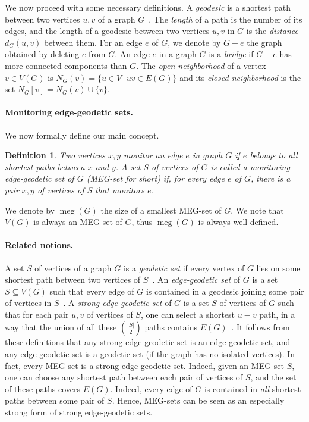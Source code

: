 \documentclass[10pt,a4paper]{article}
\newtheorem{definition}[theorem]{Definition}
\DeclareMathOperator{\MEG}{meg}
\begin{document}
We now proceed with some necessary definitions. A \emph{geodesic} is a shortest path between two vertices $u,v$ of a graph $G$~\cite{b2}. The \emph{length} of a path is the number of its edges, and the length of a geodesic between two vertices $u,v$ in $G$ is the \emph{distance} $d_G(u,v)$ between them. For an edge $e$ of $G$, we denote by $G-e$ the graph obtained by deleting $e$ from $G$. An edge $e$ in a graph $G$ is a \emph{bridge} if $G-e$ has more connected components than $G$. 
The \emph{open neighborhood} of a vertex $v \in V(G)$ is $N_G(v) = \{u \in V \, | \, uv \in E(G)\}$ and its \emph{closed neighborhood} is the set $N_G[v] = N_G(v) \cup \{v\}$.  
 


\paragraph{Monitoring edge-geodetic sets.}
We now formally define our main concept. 

\begin{definition}
Two vertices $x,y$ \emph{monitor} an edge $e$ in graph $G$ if $e$ belongs to all shortest paths between $x$ and $y$. A set $S$ of vertices of $G$ is called a \emph{monitoring edge-geodetic set} of $G$ (\emph{MEG-set} for short) if, for every edge $e$ of $G$, there is a pair $x,y$ of vertices of $S$ that monitors $e$.
\end{definition}

We denote by $\MEG(G)$ the size of a smallest MEG-set of $G$. We note that $V(G)$ is always an MEG-set of $G$, thus $\MEG(G)$ is always well-defined.


\paragraph{Related notions.}
A set $S$ of vertices of a graph $G$ is a \emph{geodetic set} if every vertex of $G$ lies on some shortest path between two vertices of $S$~\cite{r4}. An \emph{edge-geodetic set} of $G$ is a set $S \subseteq V(G)$ such that every edge of $G$ is contained in a geodesic joining some pair of vertices in $S$~\cite{r5}. A \emph{strong edge-geodetic set} of $G$ is a set $S$ of vertices of $G$ such that for each pair $u,v$ of vertices of $S$, one can select a shortest $u-v$ path, in a way that the union of all these $\binom{|S|}{2}$ paths contains $E(G)$~\cite{SEGS}. It follows from these definitions that any strong edge-geodetic set is an edge-geodetic set, and any edge-geodetic set is a geodetic set (if the graph has no isolated vertices). In fact, every MEG-set is a strong edge-geodetic set. Indeed, given an MEG-set $S$, one can choose any shortest path between each pair of vertices of $S$, and the set of these paths covers $E(G)$. Indeed, every edge of $G$ is contained in \emph{all} shortest paths between some pair of $S$. Hence, MEG-sets can be seen as an especially strong form of strong edge-geodetic sets.
\end{document}
